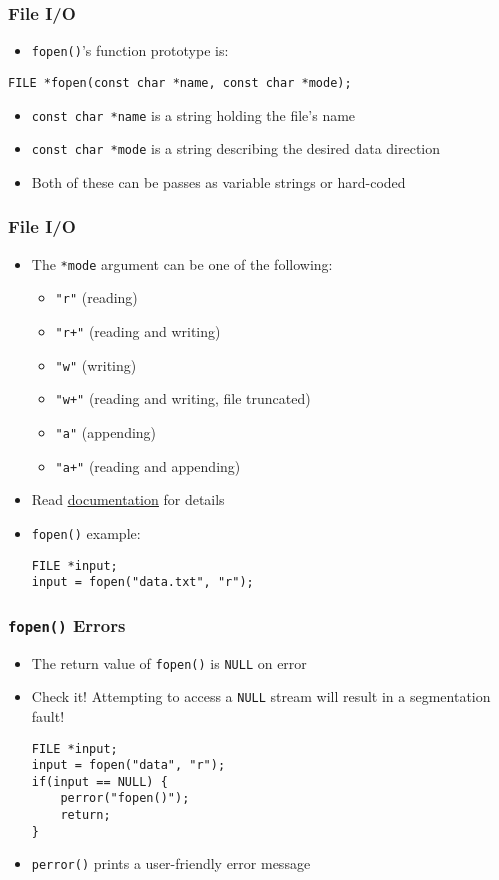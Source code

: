 \documentclass[14pt]{beamer}
\begin{document}
\begin{frame}[fragile]
\frametitle{File I/O}
\begin{itemize}
\item \texttt{fopen()}'s function prototype is:
\end{itemize}
\begin{lstlisting}[style=CStyle]
FILE *fopen(const char *name, const char *mode);
\end{lstlisting}
\begin{itemize}
\item \texttt{const char *name} is a string holding the file's name
\item \texttt{const char *mode} is a string describing the desired data direction
\item Both of these can be passes as variable strings or hard-coded
\end{itemize}
\end{frame}

\begin{frame}[fragile]
\frametitle{File I/O}
\begin{itemize}
\item The \texttt{*mode} argument can be one of the following:
	\begin{itemize}
		\item \texttt{"r"} (reading)
		\item \texttt{"r+"} (reading and writing)
		\item \texttt{"w"} (writing)
		\item \texttt{"w+"} (reading and writing, file truncated)
		\item \texttt{"a"} (appending)
		\item \texttt{"a+"} (reading and appending)
	\end{itemize}
\item Read \underline{\href{http://man7.org/linux/man-pages/man3/fopen.3.html}{documentation}} for details
\item \texttt{fopen()} example:
\begin{lstlisting}[style=CStyle]
FILE *input;
input = fopen("data.txt", "r");
\end{lstlisting}
\end{itemize}
\end{frame}

\begin{frame}[fragile]
\frametitle{\texttt{fopen()} Errors}
\begin{itemize}
\item The return value of \texttt{fopen()} is \texttt{NULL} on error
\item Check it! Attempting to access a \texttt{NULL} stream will result in a segmentation fault!
\begin{lstlisting}[style=CStyle]
FILE *input;
input = fopen("data", "r");
if(input == NULL) {
	perror("fopen()");
	return;
}
\end{lstlisting}
\item \texttt{perror()} prints a user-friendly error message
\end{itemize}
\end{frame}
\end{document}
